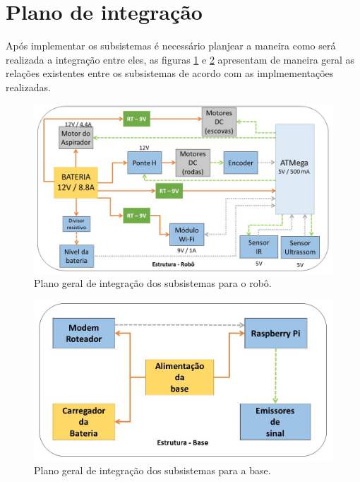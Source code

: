 \section{Plano de integração} %
\label{sec:plano_de_integração_e_validação}
	Após implementar os subsistemas é necessário planjear a maneira como será realizada a integração entre eles, as figuras \ref{img:integração_robô} e \ref{img:integração_base} apresentam de maneira geral as relações existentes entre os subsistemas de acordo com as implmementações realizadas.

	\begin{figure}[H]                                                           
   		\centering                                                                
   		\includegraphics[scale=0.48]{figuras/plano_integracao_robo.jpg}               
   		\caption{Plano geral de integração dos subsistemas para o robô.}    
   		\label{img:integração_robô}                                            
   	\end{figure} 

   	\begin{figure}[H]                                                           
   		\centering                                                                
   		\includegraphics[scale=0.5]{figuras/plano_integracao_base.jpg}               
   		\caption{Plano geral de integração dos subsistemas para a base.}    
   		\label{img:integração_base}                                            
   	\end{figure} 

